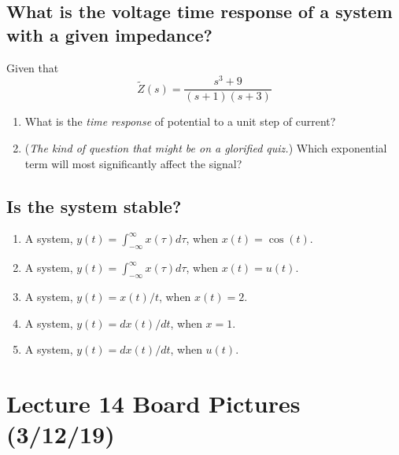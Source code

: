 \documentclass[11pt]{book}
\begin{document}
\subsection{What is the voltage time response of a system with a given impedance?}
Given that 
\begin{equation}
	\tilde{Z}(s) = \frac{s^3+9}{(s+1)(s+3)}
\end{equation}
\begin{enumerate}
	\item What is the \textit{time response} of potential to a unit step of current?
	\item (\textit{The kind of question that might be on a glorified quiz.}) Which exponential term will most significantly affect the signal?
\end{enumerate}

\subsection{Is the system stable?}
\begin{enumerate}
	\item A system, $y(t) = \int_{-\infty}^{\infty}x(\tau)d\tau$, when $x(t) = \cos(t)$.
	\item A system, $y(t) = \int_{-\infty}^{\infty}x(\tau)d\tau$, when $x(t) = u(t)$.
	\item A system, $y(t) = x(t)/t$, when $x(t) = 2$.
	\item A system, $y(t) = dx(t)/dt$, when $x=1$.
	\item A system, $y(t) = dx(t)/dt$, when $u(t)$.
\end{enumerate}


\section{Lecture 14 Board Pictures (3/12/19)}
\end{document}
